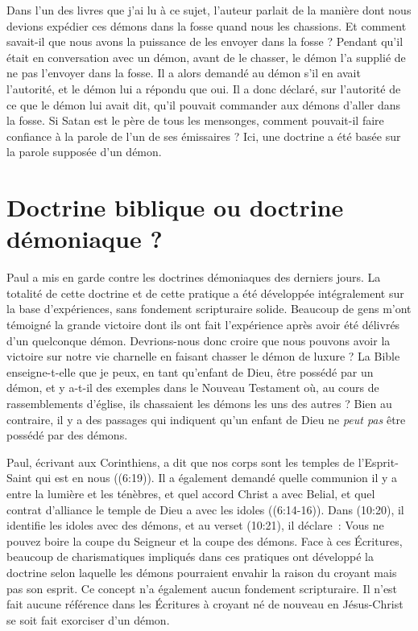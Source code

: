 Dans l'un des livres que j'ai lu à ce sujet, l'auteur parlait
 de la manière dont nous devions expédier ces démons dans la fosse
 quand nous les chassions. Et comment savait-il que nous avons la puissance
 de les envoyer dans la fosse ? Pendant qu'il était en conversation
 avec un démon, avant de le chasser, le démon l'a supplié de ne pas
 l'envoyer dans la fosse. Il a alors demandé au démon s'il en avait
 l'autorité, et le démon lui a répondu que oui.
 Il a donc déclaré, sur l'autorité de ce que le démon lui avait dit,
 qu'il pouvait commander aux démons d'aller dans la fosse.
 Si Satan  est le père de tous les mensonges,
 comment pouvait-il faire
 confiance à la parole de l'un de ses émissaires ?
 Ici, une doctrine a été basée sur la parole supposée d'un démon.
 \nowidow


\section{Doctrine biblique ou doctrine d\'emoniaque ?}

Paul a mis en garde contre les doctrines démoniaques des derniers jours.
 La totalité de cette doctrine et de cette pratique a été développée intégralement
 sur la base d'expériences, sans fondement scripturaire solide.
 Beaucoup de gens m'ont témoigné la grande victoire dont ils ont fait
 l'expérience après avoir été délivrés d'un quelconque démon.
 Devrions-nous donc croire que nous pouvons avoir la victoire
 sur notre vie charnelle en faisant chasser le démon de luxure ?
 La Bible enseigne-t-elle que je peux, en tant qu'enfant de Dieu,
 être possédé par un démon, et y a-t-il des exemples dans le Nouveau
 Testament où, au cours de rassemblements d'église, ils chassaient
 les démons les uns des autres ? Bien au contraire, il y a des passages
 qui indiquent qu'un enfant de Dieu ne \emph{peut pas} être possédé par des démons.

Paul, écrivant aux Corinthiens, a dit que nos corps sont les temples
 de l'Esprit-Saint qui est en nous ((6:19)).
 Il a également demandé quelle communion il y a entre la lumière
 et les ténèbres, et quel accord Christ a avec Belial,
 et quel contrat d'alliance le temple de Dieu a avec les idoles
 ((6:14-16)). Dans (10:20),
 il identifie les idoles avec des démons, et au verset (10:21),
 il déclare~: \og Vous ne pouvez boire la coupe du Seigneur
 et la coupe des démons. \fg{} Face à ces Écritures,
 beaucoup de charismatiques impliqués dans ces pratiques
 ont développé la doctrine selon laquelle les démons pourraient envahir
 la raison du croyant mais pas son esprit.
 Ce concept n'a également aucun fondement scripturaire.
 Il n'est fait aucune référence dans les Écritures à croyant né de nouveau
 en Jésus-Christ se soit fait exorciser d'un démon.
 \nowidow

